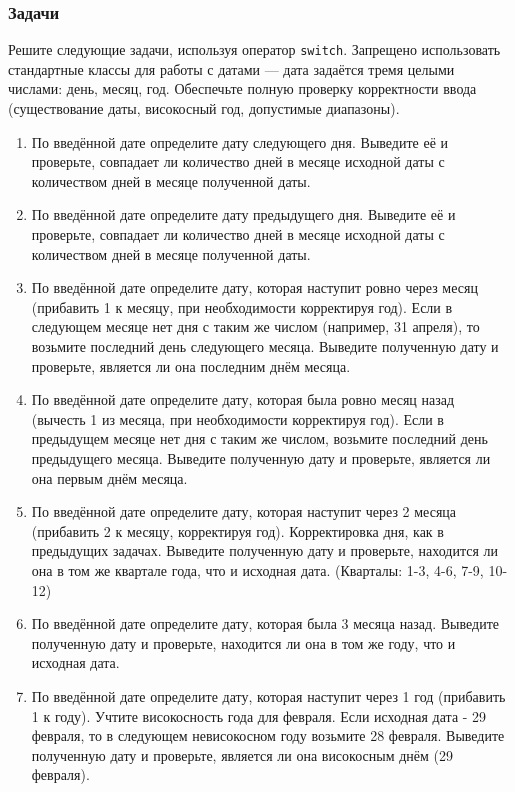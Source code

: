 \documentclass[12pt]{article}
\begin{document}
\subsubsection*{Задачи}

Решите следующие задачи, используя оператор \texttt{switch}. Запрещено использовать стандартные классы для работы с датами — дата задаётся тремя целыми числами: день, месяц, год. Обеспечьте полную проверку корректности ввода (существование даты, високосный год, допустимые диапазоны).

\begin{enumerate}
    \item По введённой дате определите дату следующего дня. Выведите её и проверьте, совпадает ли количество дней в месяце исходной даты с количеством дней в месяце полученной даты.
    \item По введённой дате определите дату предыдущего дня. Выведите её и проверьте, совпадает ли количество дней в месяце исходной даты с количеством дней в месяце полученной даты.
    \item По введённой дате определите дату, которая наступит ровно через месяц (прибавить 1 к месяцу, при необходимости корректируя год). Если в следующем месяце нет дня с таким же числом (например, 31 апреля), то возьмите последний день следующего месяца. Выведите полученную дату и проверьте, является ли она последним днём месяца.
    \item По введённой дате определите дату, которая была ровно месяц назад (вычесть 1 из месяца, при необходимости корректируя год). Если в предыдущем месяце нет дня с таким же числом, возьмите последний день предыдущего месяца. Выведите полученную дату и проверьте, является ли она первым днём месяца.
    \item По введённой дате определите дату, которая наступит через 2 месяца (прибавить 2 к месяцу, корректируя год). Корректировка дня, как в предыдущих задачах. Выведите полученную дату и проверьте, находится ли она в том же квартале года, что и исходная дата. (Кварталы: 1-3, 4-6, 7-9, 10-12)
    \item По введённой дате определите дату, которая была 3 месяца назад. Выведите полученную дату и проверьте, находится ли она в том же году, что и исходная дата.
    \item По введённой дате определите дату, которая наступит через 1 год (прибавить 1 к году). Учтите високосность года для февраля. Если исходная дата - 29 февраля, то в следующем невисокосном году возьмите 28 февраля. Выведите полученную дату и проверьте, является ли она високосным днём (29 февраля).

\end{enumerate}
\end{document}
